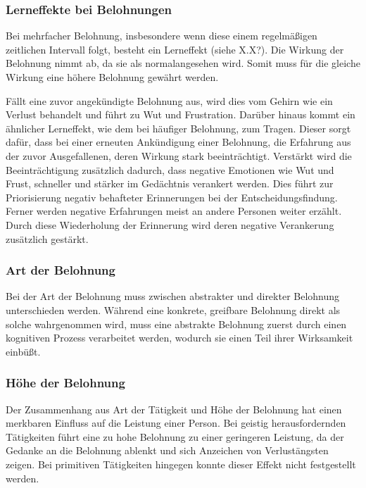 \subsubsection{Lerneffekte bei Belohnungen}
Bei mehrfacher Belohnung, insbesondere wenn diese einem regelmäßigen zeitlichen Intervall folgt, besteht ein Lerneffekt (siehe X.X?). Die Wirkung der Belohnung nimmt ab, da sie als \glqq normal\grqq angesehen wird. Somit muss für die gleiche Wirkung eine höhere Belohnung gewährt werden. \citep[S. 80]{Nowka.2013}
 
Fällt eine zuvor angekündigte Belohnung aus, wird dies vom Gehirn wie ein Verlust behandelt und führt zu Wut und Frustration. Darüber hinaus kommt ein ähnlicher Lerneffekt, wie dem bei häufiger Belohnung, zum Tragen. Dieser sorgt dafür, dass bei einer erneuten Ankündigung einer Belohnung, die Erfahrung aus der zuvor Ausgefallenen, deren Wirkung stark beeinträchtigt. Verstärkt wird die Beeinträchtigung zusätzlich dadurch, dass negative Emotionen wie Wut und Frust, schneller und stärker im Gedächtnis verankert werden. Dies führt zur Priorisierung negativ behafteter Erinnerungen bei der Entscheidungsfindung. Ferner werden negative Erfahrungen meist an andere Personen weiter erzählt. Durch diese Wiederholung der Erinnerung wird deren negative Verankerung zusätzlich gestärkt. \citep[S. 76ff]{Nowka.2013}

\subsubsection{Art der Belohnung}
Bei der Art der Belohnung muss zwischen abstrakter und direkter Belohnung unterschieden werden. Während eine konkrete, greifbare Belohnung direkt als solche wahrgenommen wird, muss eine abstrakte Belohnung zuerst durch einen kognitiven Prozess verarbeitet werden, wodurch sie einen Teil ihrer Wirksamkeit einbüßt. \citep[S. 79f]{Nowka.2013}

\subsubsection{Höhe der Belohnung}
Der Zusammenhang aus Art der Tätigkeit und Höhe der Belohnung hat einen merkbaren Einfluss auf die Leistung einer Person. Bei geistig herausfordernden Tätigkeiten führt eine zu hohe Belohnung zu einer geringeren Leistung, da der Gedanke an die Belohnung ablenkt und sich Anzeichen von Verlustängsten zeigen. Bei primitiven Tätigkeiten hingegen konnte dieser Effekt nicht festgestellt werden. \citep[S. 80f]{Nowka.2013}

